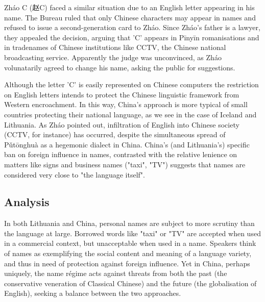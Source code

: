 Zháo C ({\zafont 赵}C) faced a similar situation due to an English letter
appearing in his name. The Bureau ruled that only Chinese characters may appear
in names and refused to issue a second-generation card to Zháo. Since Zháo's
father is a lawyer, they appealed the decision, arguing that 'C' appears in
Pīnyīn romanisations and in tradenames of Chinese institutions like CCTV, the
Chinese national broadcasting service. Apparently the judge was unconvinced, as
Zháo volunatarily agreed to change his name, asking the public for suggestions.
\parencite{martinsen09}

Although the letter 'C' is easily represented on Chinese computers the
restriction on English letters intends to protect the Chinese linguistic
framework from Western encroachment. In this way, China's approach is more
typical of small countries protecting their national language, as we see in the
case of Iceland and Lithuania. As Zháo pointed out, infiltration of English into
Chinese society (CCTV, for instance) has occurred, despite the simultaneous
spread of Pǔtōnghuà as a hegemonic dialect in China. China's (and Lithuania's)
specific ban on foreign influence in names, contrasted with the relative
lenience on matters like signs and business names ("taxi", "TV") suggests that
names are considered very close to "the language itself".

\subsection{Analysis}

In both Lithuania and China, personal names are subject to more scrutiny than
the language at large. Borrowed words like "taxi" or "TV" are accepted when used
in a commercial context, but unacceptable when used in a name. Speakers think of
names as exemplifying the social content and meaning of a language variety, and
thus in need of protection against foreign influence. Yet in China, perhaps
uniquely, the name régime acts against threats from both the past (the
conservative veneration of Classical Chinese) and the future (the globalisation
of English), seeking a balance between the two approaches.
